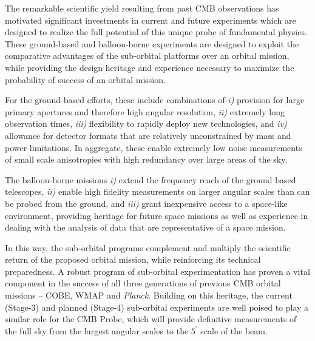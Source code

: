 %
%

The remarkable scientific yield resulting from past CMB observations
has motivated significant investments in current and future
experiments which are designed to realize the full potential of this
unique probe of fundamental physics.  These ground-based and
balloon-borne experiments are designed to exploit the comparative
advantages of the sub-orbital platforms over an orbital mission, while
providing the design heritage and experience necessary to maximize the
probability of success of an orbital mission.

For the ground-based efforts, these include combinations of {\it i)}
provision for large primary apertures and therefore high angular
resolution, {\it ii)} extremely long observation times, {\it iii)}
flexibility to rapidly deploy new technologies, and {\it iv)}
allowance for detector formats that are relatively unconstrained by
mass and power limitations.  In aggregate, these enable extremely low
noise measurements of small scale anisotropies with high redundancy
over large areas of the sky.

The balloon-borne missions {\it i)} extend the frequency reach of the
ground based telescopes, {\it ii)} enable high fidelity measurements
on larger angular scales than can be probed from the ground, and {\it
  iii)} grant inexpensive access to a space-like environment,
providing heritage for future space missions as well as experience in
dealing with the analysis of data that are representative of a space
mission.

In this way, the sub-orbital programs complement and multiply the
scientific return of the proposed orbital mission, while reinforcing
its technical preparedness.  A robust program of sub-orbital
experimentation has proven a vital component in the success of all
three generations of previous CMB orbital missions -- COBE, WMAP and
{\it Planck}. Building on this heritage, the current (Stage-3) and
planned (Stage-4) sub-orbital experiments are well poised to play a
similar role for the CMB Probe, which will provide definitive
measurements of the full sky from the largest angular scales to the
$5^\prime$ scale of the beam.







